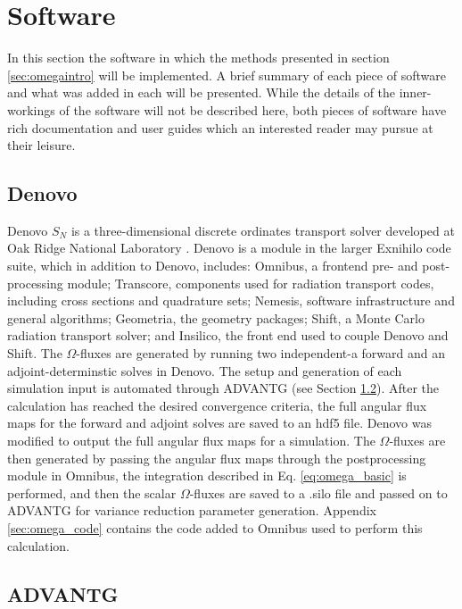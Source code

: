 \section{Software}
\label{sec:software}

In this section the software in which the methods presented in section
\ref{sec:omegaintro} will be implemented. A brief summary of each piece of
software and what was added in each will be presented.
While the details of the inner-workings of the software will not be described
here, both pieces of software have rich documentation and user guides which an
interested reader may pursue at their leisure.

\subsection{Denovo}

Denovo $S_N$ is a three-dimensional discrete ordinates transport solver
developed at Oak Ridge National Laboratory \cite{evans_denovo:_2010}. Denovo is a module in the larger
Exnihilo code suite, which in addition to Denovo,
includes: Omnibus, a frontend pre- and post-processing module; Transcore,
components used for radiation transport codes, including cross sections and
quadrature sets; Nemesis, software infrastructure and general algorithms;
Geometria, the geometry packages; Shift, a Monte Carlo radiation transport
solver; and Insilico, the front end used to couple Denovo and Shift. The
$\Omega$-fluxes are generated by running two independent-a forward and an
adjoint-determinstic solves in Denovo. The setup and generation of each
simulation input is automated through ADVANTG (see Section \ref{sec:advantg}).
After the calculation has reached the desired convergence criteria, the
full angular flux maps for the
forward and adjoint solves are saved to an hdf5 \cite{hdf5} file. Denovo was
modified to output the full angular flux maps for a simulation. The
$\Omega$-fluxes are then generated by passing the angular flux maps through the
postprocessing module in Omnibus, the integration described in Eq.
\ref{eq:omega_basic} is performed, and then the scalar $\Omega$-fluxes are saved
to a .silo file and passed on to ADVANTG for variance reduction parameter
generation. Appendix \ref{sec:omega_code} contains the code added to Omnibus
used to perform this calculation.

\subsection{ADVANTG}
\label{sec:advantg}

